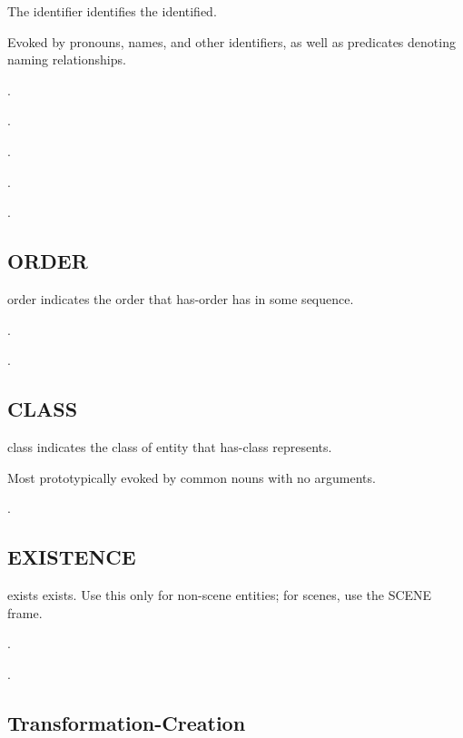 \documentclass[a4paper]{article}
\newcommand{\fr}[1]{\textsf{#1}}
\newcommand{\rl}[1]{\textsf{#1}}
\begin{document}
The \rl{identifier} identifies the \rl{identified}.

Evoked by pronouns, names, and other identifiers, as well as predicates
denoting naming relationships.

\ex.

\ex.

\ex.

\ex.

\ex.

\subsection{\fr{ORDER}}
\label{sec:ORDER}

\rl{order} indicates the order that \rl{has-order} has in some sequence.

\ex.

\ex.

\subsection{\fr{CLASS}}
\label{sec:CLASS}

\rl{class} indicates the class of entity that \rl{has-class} represents.

Most prototypically evoked by common nouns with no arguments.

\ex.

\subsection{\fr{EXISTENCE}}
\label{sec:EXISTENCE}

\rl{exists} exists. Use this only for non-scene entities; for scenes, use the \fr{SCENE} frame.

\ex.

\ex.

\subsection{\fr{Transformation-Creation}}
\label{sec:Transformation-Creation}
\end{document}
